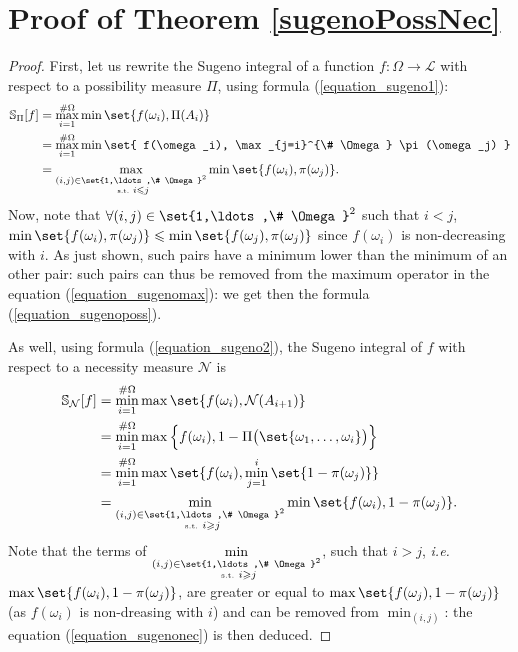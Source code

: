 \section{Proof of Theorem \ref{sugenoPossNec}}
\begin{proof}
First, let us rewrite the Sugeno integral of a function $f:\Omega \rightarrow \mathcal{L}$ 
with respect to a possibility measure $\Pi$, using formula (\ref{equation_sugeno1}): 
\begin{align}
\nonumber \mathbb{S}_{\Pi}[f] &= \max_{i=1}^{\# \Omega} \min \set{ f(\omega_i), \Pi(A_i) } \\
\nonumber &= \max_{i=1}^{\# \Omega} \min \set{  f(\omega_i), \max_{j=i}^{\# \Omega} \pi(\omega_j)  } \\
\label{equation_sugenomax} &= \max_{\substack{ (i,j) \in \set{1,\ldots,\# \Omega}^2  \\ \mbox{ \tiny s.t. } i \leqslant j} } \min \set{  f(\omega_i),  \pi(\omega_j)  }. 
\end{align}
Now, note that $\forall (i,j) \in \set{1,\ldots,\# \Omega}^2$ such that $i<j$,
$\min \set{ f(\omega_i), \pi(\omega_j) } \leqslant \min \set{ f(\omega_j), \pi(\omega_j) } $
since $f(\omega_i)$ is non-decreasing with $i$.
As just shown, such pairs 
have a minimum lower than the minimum of an other pair: 
such pairs can thus be removed 
from the maximum operator 
in the equation (\ref{equation_sugenomax}):
we get then the formula (\ref{equation_sugenoposs}).

As well, using formula (\ref{equation_sugeno2}),
the Sugeno integral of $f$ with respect to a necessity measure $\mathcal{N}$ is
\begin{align}
\nonumber \mathbb{S}_{\mathcal{N}}[f] &= \min_{i=1}^{\# \Omega} \max \set{ f(\omega_i), \mathcal{N}(A_{i+1}) } \\
\nonumber &= \min_{i=1}^{\# \Omega} \max \Big\{ f(\omega_i), 1 - \Pi \big( \set{\omega_1,\ldots,\omega_i} \big) \Big\} \\
\nonumber &= \min_{i=1}^{\# \Omega} \max \set{  f(\omega_i), \min_{j=1}^{i} \set{1 - \pi(\omega_j)}  } \\
\label{equation_sugenomin} &= \min_{\substack{ (i,j) \in \set{1,\ldots,\# \Omega}^2  \\ \mbox{ \tiny s.t. } i \geqslant j} } \min \set{  f(\omega_i), 1 - \pi(\omega_j)  }. 
\end{align}
Note that the terms of $\displaystyle \min_{\substack{ (i,j) \in \set{1,\ldots,\# \Omega}^2  \\ \mbox{ \tiny s.t. } i \geqslant j} }$,
such that $i>j$, \textit{i.e.} $\max \set{ f(\omega_i), 1-\pi(\omega_j) }$,
are greater or equal to $\max \set{ f(\omega_j), 1-\pi(\omega_j) }$
(as $f(\omega_i)$ is non-dreasing with $i$)
and can be removed from $\displaystyle \min_{(i,j)}$:
the equation (\ref{equation_sugenonec}) is then deduced.
\end{proof}









